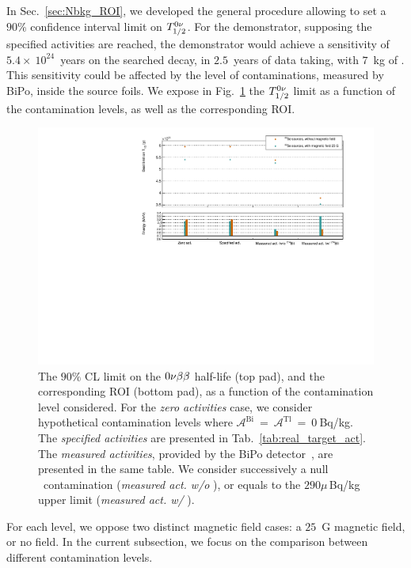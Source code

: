 In Sec.~\ref{sec:Nbkg_ROI}, we developed the general procedure allowing to set a $90\%$ confidence interval limit on $T_{1/2}^{0\nu}$.
For the demonstrator, supposing the specified activities are reached, the demonstrator would achieve a sensitivity of $5.4\times~10^{24}$~years on the searched decay, in $2.5$~years of data taking, with $7$~kg of \Se.
This sensitivity could be affected by the level of contaminations, measured by BiPo, inside the source foils.
We expose in Fig.~\ref{fig:real_target_act} the $T_{1/2}^{0\nu}$ limit as a function of the contamination levels, as well as the corresponding ROI.
\begin{figure}[h]
  \centering
  \includegraphics[width=1.1\textwidth]{Sensitivity/fig_sensitivity/contamination_level_Se_B.pdf}
  \caption{The $90\%$ CL limit on the $0\nu\beta\beta$ half-life (top pad), and the corresponding ROI (bottom pad), as a function of the contamination level considered.
    For the \emph{zero activities} case, we consider hypothetical contamination levels where $\mathcal{A}^{\text{Bi}}~=~\mathcal{A}^{\text{Tl}}~=~0~$Bq/kg.
    The \emph{specified activities} are presented in Tab.~\ref{tab:real_target_act}.
    The \emph{measured activities}, provided by the BiPo detector~\cite{internal:bipo}, are presented in the same table.
    We consider successively a null \Bi\ contamination (\emph{measured act. w/o \Bi}), or equals to the $290\mu\,$Bq/kg upper limit (\emph{measured act. w/ \Bi}).
    \label{fig:real_target_act}}
\end{figure}
For each level, we oppose two distinct magnetic field cases: a $25$~G magnetic field, or no field.
In the current subsection, we focus on the comparison between different contamination levels.

